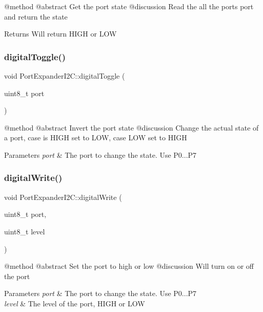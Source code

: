@method @abstract Get the port state @discussion Read the all the ports port and return the state \begin{DoxyReturn}{Returns}
Will return H\+I\+GH or L\+OW 
\end{DoxyReturn}
\mbox{\label{classPortExpanderI2C_a7c686d2a180ca46a36a3c72fcebb1b5f}} 
\subsubsection{\texorpdfstring{digitalToggle()}{digitalToggle()}}
{\footnotesize\ttfamily void Port\+Expander\+I2\+C\+::digital\+Toggle (\begin{DoxyParamCaption}\item[{uint8\+\_\+t}]{port }\end{DoxyParamCaption})}

@method @abstract Invert the port state @discussion Change the actual state of a port, case is H\+I\+GH set to L\+OW, case L\+OW set to H\+I\+GH 
\begin{DoxyParams}{Parameters}
{\em port} & The port to change the state. Use P0...P7 \\
\hline
\end{DoxyParams}
\mbox{\label{classPortExpanderI2C_abcf3cb2908c42bf061933a19b714dc73}} 
\subsubsection{\texorpdfstring{digitalWrite()}{digitalWrite()}}
{\footnotesize\ttfamily void Port\+Expander\+I2\+C\+::digital\+Write (\begin{DoxyParamCaption}\item[{uint8\+\_\+t}]{port,  }\item[{uint8\+\_\+t}]{level }\end{DoxyParamCaption})}

@method @abstract Set the port to high or low @discussion Will turn on or off the port 
\begin{DoxyParams}{Parameters}
{\em port} & The port to change the state. Use P0...P7 \\
\hline
{\em level} & The level of the port, H\+I\+GH or L\+OW \\
\hline
\end{DoxyParams}
\mbox{\label{classPortExpanderI2C_a0f734bdb394c1cf0deebd053ca9a3593}} 
